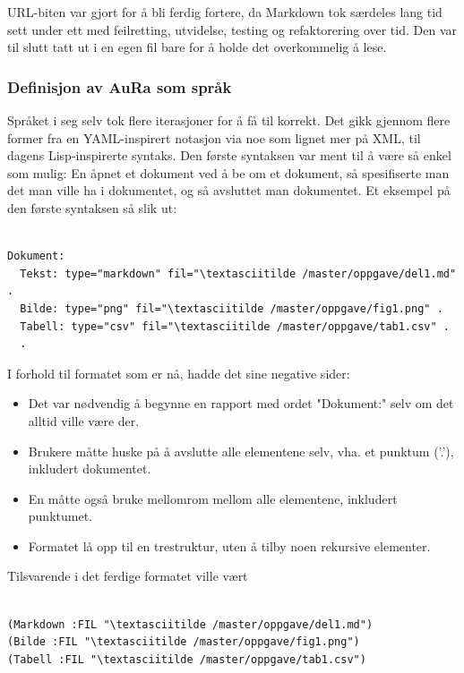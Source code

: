 \documentclass[norsk, 11pt, a4paper]{article}
\begin{document}
URL-biten var gjort for å bli ferdig fortere, da Markdown tok særdeles lang tid sett under ett med feilretting, utvidelse, testing og refaktorering over tid. Den var til slutt tatt ut i en egen fil bare for å holde det overkommelig å lese.



\subsubsection{Definisjon av AuRa som språk}



Språket i seg selv tok flere iterasjoner for å få til korrekt.
Det gikk gjennom flere former fra en YAML-inspirert notasjon via noe som lignet mer på XML, til dagens Lisp-inspirerte syntaks.
Den første syntaksen var ment til å være så enkel som mulig: En åpnet et dokument ved å be om et dokument, så spesifiserte man det man ville ha i dokumentet, og så avsluttet man dokumentet. Et eksempel på den første syntaksen så slik ut:




\begin{lstlisting}

Dokument:
  Tekst: type="markdown" fil="\textasciitilde /master/oppgave/del1.md" .
  Bilde: type="png" fil="\textasciitilde /master/oppgave/fig1.png" .
  Tabell: type="csv" fil="\textasciitilde /master/oppgave/tab1.csv" .
  .
\end{lstlisting}




I forhold til formatet som er nå, hadde det sine negative sider:




\begin{itemize}
\item Det var nødvendig å begynne en rapport med ordet "Dokument:" selv om det alltid ville være der.
\item Brukere måtte huske på å avslutte alle elementene selv, vha. et punktum ('.'), inkludert dokumentet.
\item En måtte også bruke mellomrom mellom alle elementene, inkludert punktumet.
\item Formatet lå opp til en trestruktur, uten å tilby noen rekursive elementer.
\end{itemize}




Tilsvarende i det ferdige formatet ville vært




\begin{lstlisting}

(Markdown :FIL "\textasciitilde /master/oppgave/del1.md")
(Bilde :FIL "\textasciitilde /master/oppgave/fig1.png")
(Tabell :FIL "\textasciitilde /master/oppgave/tab1.csv")
\end{lstlisting}
\end{document}
